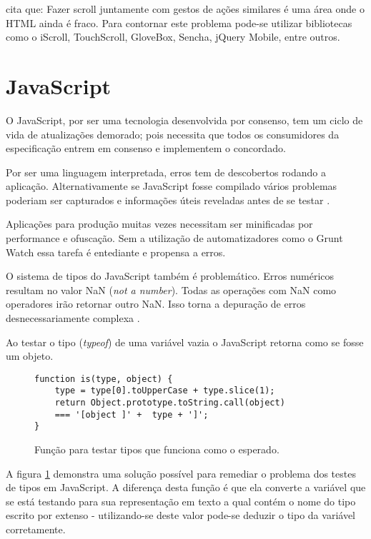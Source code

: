 \autocite[pp. 9]{aSeriousContender} cita que: Fazer scroll juntamente
com gestos de ações similares é uma área onde o HTML ainda é
fraco. Para contornar este problema pode-se utilizar bibliotecas como o
iScroll, TouchScroll, GloveBox, Sencha, jQuery Mobile, entre outros.

\section{JavaScript}

O JavaScript, por ser uma tecnologia desenvolvida por consenso, tem
um ciclo de vida de atualizações demorado; pois necessita que todos
os consumidores da especificação entrem em consenso e implementem o
concordado.

Por ser uma linguagem interpretada, erros tem de descobertos rodando
a aplicação. Alternativamente se JavaScript fosse compilado vários
problemas poderiam ser capturados e informações úteis reveladas antes
de se testar \autocite[pp. 12]{viabilityBusinessApplications}.

Aplicações para produção muitas vezes necessitam ser minificadas por
performance e ofuscação. Sem a utilização de automatizadores como o
Grunt Watch essa tarefa é entediante e propensa a erros.

O sistema de tipos do JavaScript também é problemático.
Erros numéricos resultam no valor NaN (\textit{not a number}).
Todas as operações com NaN como operadores irão retornar outro
NaN. Isso torna a depuração de erros desnecessariamente complexa
\autocite{html5mostwanted}.

Ao testar o tipo (\textit{typeof}) de uma variável vazia o JavaScript
retorna como se fosse um objeto.

\begin{figure}[H]
\centering
\begin{verbatim}
function is(type, object) {
    type = type[0].toUpperCase + type.slice(1);
    return Object.prototype.toString.call(object)
    === '[object ]' +  type + ']';
}
\end{verbatim}
\caption{Função para testar tipos que funciona como o esperado.}
\label{fig:fixJSTypes}
\end{figure}

A figura \ref{fig:fixJSTypes} demonstra uma solução possível para
remediar o problema dos testes de tipos em JavaScript. A diferença
desta função é que ela converte a variável que se está testando
para sua representação em texto a qual contém o nome do tipo escrito
por extenso - utilizando-se deste valor pode-se deduzir o tipo da
variável corretamente.


